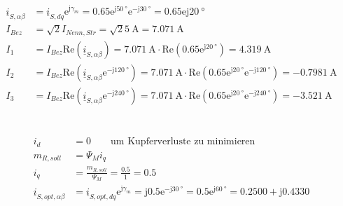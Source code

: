 \documentclass[11pt,a4paper]{scrartcl}
\newcommand{\mybr}[1]{\left(#1\right)}
\renewcommand{\j}{\mathrm{j}}
\renewcommand{\i}{\underline{i}}
\newcommand{\0}{_{\mybr{0}}}
\newcommand{\1}{_{\mybr{1}}}
\newcommand{\2}{_{\mybr{2}}}
\renewcommand{\e}{\mathrm{e}}
\renewcommand{\Re}{\mathrm{Re}}
\newcommand{\isab}{\i_{S,\alpha\beta}}
\newcommand{\isdq}{\i_{S,dq}}
\begin{document}
\section{}
\begin{align}
\isab&=\isdq\e^{\j\gamma_m}=\num{0.65}\e^{\j\SI{50}{\degree}}\e^{-\j\SI{30}{\degree}}=\num{0.65}\e{\j\SI{20}{\degree}}\\
I_{Bez}&=\sqrt{2}I_{Nenn,Str}=\sqrt{2}\SI{5}{\ampere}=\SI{7.071}{\ampere}\\
I_1&=I_{Bez}\Re\mybr{\isab}=\SI{7.071}{\ampere}\cdot\Re\mybr{\num{0.65}\e^{\j\SI{20}{\degree}}}=\SI{4.319}{\ampere}\\
I_2&=I_{Bez}\Re\mybr{\isab\e^{-\j\SI{120}{\degree}}}=\SI{7.071}{\ampere}\cdot\Re\mybr{\num{0.65}\e^{\j\SI{20}{\degree}}\e^{-\j\SI{120}{\degree}}}=\SI{-0.7981}{\ampere}\\
I_3&=I_{Bez}\Re\mybr{\isab\e^{-\j\SI{240}{\degree}}}=\SI{7.071}{\ampere}\cdot\Re\mybr{\num{0.65}\e^{\j\SI{20}{\degree}}\e^{-\j\SI{240}{\degree}}}=\SI{-3.521}{\ampere}
\end{align}

\section{}
\begin{align}
i_d&=0\quad\quad\text{um Kupferverluste zu minimieren}\\
m_{R,soll}&=\Psi_M i_q\\
i_q&=\frac{m_{R,soll}}{\Psi_M}=\frac{\num{0.5}}{1}=\num{0.5}\\
\i_{S,opt,\alpha\beta}&=\i_{S,opt,dq}\e^{\j\gamma_m}=\j\num{0.5}\e^{-\j\SI{30}{\degree}}=\num{0.5}\e^{\j\SI{60}{\degree}}=\num{0.2500}+\j\num{0.4330}
\end{align}
\end{document}
